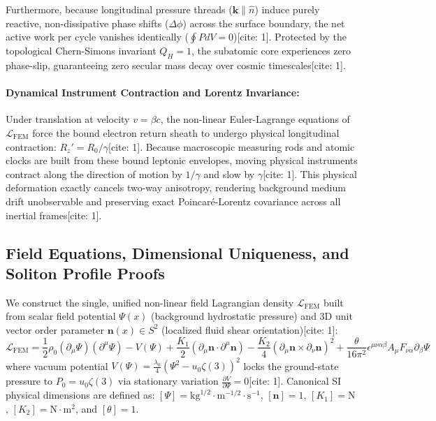 \documentclass[11pt,a4paper]{article}
\begin{document}
	Furthermore, because longitudinal pressure threads ($\mathbf{k} \parallel \hat{n}$) induce purely reactive, non-dissipative phase shifts ($\Delta\phi$) across the surface boundary, the net active work per cycle vanishes identically ($\oint P dV = 0$)[cite: 1]. Protected by the topological Chern-Simons invariant $Q_H = 1$, the subatomic core experiences zero phase-slip, guaranteeing zero secular mass decay over cosmic timescales[cite: 1].
	
	\paragraph{Dynamical Instrument Contraction and Lorentz Invariance:}
	Under translation at velocity $v = \beta c$, the non-linear Euler-Lagrange equations of $\mathcal{L}_{\text{FEM}}$ force the bound electron return sheath to undergo physical longitudinal contraction: $R_z' = R_0/\gamma$[cite: 1]. Because macroscopic measuring rods and atomic clocks are built from these bound leptonic envelopes, moving physical instruments contract along the direction of motion by $1/\gamma$ and slow by $\gamma$[cite: 1]. This physical deformation exactly cancels two-way anisotropy, rendering background medium drift unobservable and preserving exact Poincaré-Lorentz covariance across all inertial frames[cite: 1].
	
	\subsection{Field Equations, Dimensional Uniqueness, and Soliton Profile Proofs}
	We construct the single, unified non-linear field Lagrangian density $\mathcal{L}_{\text{FEM}}$ built from scalar field potential $\Psi(x)$ (background hydrostatic pressure) and 3D unit vector order parameter $\mathbf{n}(x) \in S^2$ (localized fluid shear orientation)[cite: 1]:
	\begin{equation}
		\mathcal{L}_{\text{FEM}} = \frac{1}{2} \rho_0 (\partial_\mu \Psi)(\partial^\mu \Psi) - V(\Psi) + \frac{K_1}{2} (\partial_\mu \mathbf{n} \cdot \partial^\mu \mathbf{n}) - \frac{K_2}{4} (\partial_\mu \mathbf{n} \times \partial_\nu \mathbf{n})^2 + \frac{\theta}{16\pi^2} \epsilon^{\mu\nu\alpha\beta} A_\mu F_{\nu\alpha} \partial_\beta \Psi
	\end{equation}
	where vacuum potential $V(\Psi) = \frac{\lambda_0}{4} \left( \Psi^2 - u_0 \zeta(3) \right)^2$ locks the ground-state pressure to $P_0 = u_0 \zeta(3)$ via stationary variation $\frac{\partial V}{\partial \Psi} = 0$[cite: 1]. Canonical SI physical dimensions are defined as: $[\Psi] = \text{kg}^{1/2} \cdot \text{m}^{-1/2} \cdot \text{s}^{-1}$, $[\mathbf{n}] = 1$, $[K_1] = \text{N}$, $[K_2] = \text{N}\cdot\text{m}^2$, and $[\theta] = 1$.
	
\end{document}
